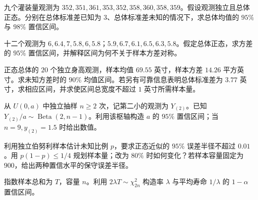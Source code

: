 \begin{exercise}[灌装量的正态均值区间]\label{q:M-P10-2}
九个灌装量观测为 $352,351,361,353,352,358,360,358,359$。假设观测独立且总体正态。分别在总体标准差已知为 $3$、总体标准差未知的情况下，求总体均值的 $95\%$ 与 $98\%$ 置信区间。\par{}\end{exercise}

\begin{exercise}[正态方差的区间]\label{q:M-P10-3}
十二个观测为 $6,6.4,7,5.8,6,5.8$；$5.9,6.7,6.1,6.5,6.3,5.8$。假定总体正态，求方差的 $95\%$ 置信区间，并解释区间为何不关于样本方差对称。\par{}\end{exercise}

\begin{exercise}[身高区间与宽度要求]\label{q:M-P11-1}
正态总体的 $20$ 个独立身高观测，样本均值 $69.55$ 英寸，样本方差 $14.26$ 平方英寸。求未知方差时的 $90\%$ 均值区间。若另有可靠信息表明总体标准差为 $3.77$ 英寸，求相应区间，并求使区间总宽度不超过 $1$ 英寸所需样本量。\par{}\end{exercise}

\begin{exercise}[顺序统计量构造端点区间]\label{q:M-P11-2}
从 $U(0,a)$ 中独立抽样 $n\ge2$ 次，记第二小的观测为 $Y_{(2)}$。已知 $Y_{(2)}/a\sim\operatorname{Beta}(2,n-1)$。利用该枢轴构造 $a$ 的 $95\%$ 置信区间；当 $n=9,y_{(2)}=1.5$ 时给出数值。\par{}\end{exercise}

\begin{exercise}[比例误差与样本量]\label{q:M-C22-3}
利用独立伯努利样本估计未知比例 $p$，要求正态近似的 $95\%$ 误差半径不超过 $0.01$。用 $p(1-p)\le1/4$ 规划样本量；改为 $80\%$ 时如何变化？若样本容量固定为 $900$，给出两种置信水平的保守误差半径。\par{}\end{exercise}

\begin{exercise}[指数率的精确区间]\label{q:B13.1}
指数样本总和为 $T$，容量 $n$。利用 $2\lambda T\sim\chi^2_{2n}$ 构造率 $\lambda$ 与平均寿命 $1/\lambda$ 的 $1-\alpha$ 置信区间。\par{}\end{exercise}

